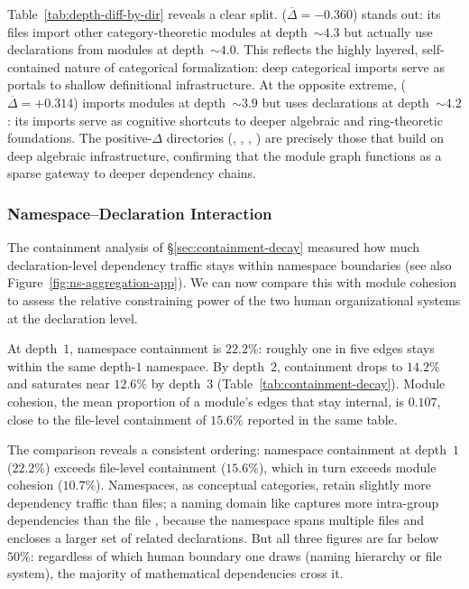 Table~\ref{tab:depth-diff-by-dir} reveals a clear split.  ($\overline{\Delta} = -0.360$) stands out: its files import other category-theoretic modules at depth~${\sim}4.3$ but actually use declarations from modules at depth~${\sim}4.0$. This reflects the highly layered, self-contained nature of categorical formalization: deep categorical imports serve as portals to shallow definitional infrastructure. At the opposite extreme,  ($\overline{\Delta} = +0.314$) imports modules at depth~${\sim}3.9$ but uses declarations at depth~${\sim}4.2$: its imports serve as cognitive shortcuts to deeper algebraic and ring-theoretic foundations. The positive-$\Delta$ directories (, , , ) are precisely those that build on deep algebraic infrastructure, confirming that the module graph functions as a sparse gateway to deeper dependency chains.

\subsubsection{Namespace--Declaration Interaction}
\label{sec:ns-decl-interaction}

The containment analysis of \S\ref{sec:containment-decay} measured how much declaration-level dependency traffic stays within namespace boundaries (see also Figure~\ref{fig:ns-aggregation-app}). We can now compare this with module cohesion to assess the relative constraining power of the two human organizational systems at the declaration level.

At depth~$1$, namespace containment is $22.2\%$: roughly one in five edges stays within the same depth-$1$ namespace. By depth~$2$, containment drops to $14.2\%$ and saturates near $12.6\%$ by depth~$3$ (Table~\ref{tab:containment-decay}). Module cohesion, the mean proportion of a module's edges that stay internal, is $0.107$, close to the file-level containment of $15.6\%$ reported in the same table.

The comparison reveals a consistent ordering: namespace containment at depth~$1$ ($22.2\%$) exceeds file-level containment ($15.6\%$), which in turn exceeds module cohesion ($10.7\%$). Namespaces, as conceptual categories, retain slightly more dependency traffic than files; a naming domain like  captures more intra-group dependencies than the file , because the namespace spans multiple files and encloses a larger set of related declarations. But all three figures are far below~$50\%$: regardless of which human boundary one draws (naming hierarchy or file system), the majority of mathematical dependencies cross it.

